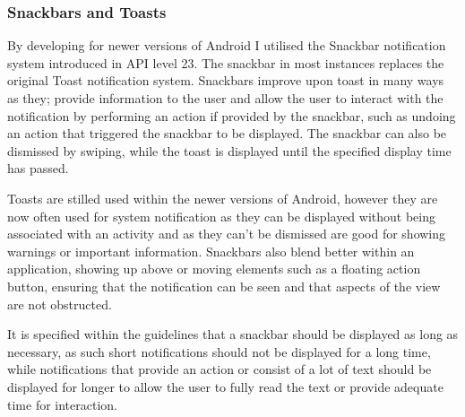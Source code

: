 \subsubsection{Snackbars and Toasts}\label{snackbars-and-toasts}

By developing for newer versions of Android I utilised the Snackbar
notification system introduced in API level 23. The snackbar in most
instances replaces the original Toast notification system. Snackbars
improve upon toast in many ways as they; provide information to the user
and allow the user to interact with the notification by performing an
action if provided by the snackbar, such as undoing an action that
triggered the snackbar to be displayed. The snackbar can also be
dismissed by swiping, while the toast is displayed until the specified
display time has passed.

Toasts are stilled used within the newer versions of Android, however
they are now often used for system notification as they can be displayed
without being associated with an activity and as they can't be dismissed
are good for showing warnings or important information. Snackbars also
blend better within an application, showing up above or moving elements
such as a floating action button, ensuring that the notification can be
seen and that aspects of the view are not obstructed.

It is specified within the guidelines that a snackbar should be
displayed as long as necessary, as such short notifications should not
be displayed for a long time, while notifications that provide an action
or consist of a lot of text should be displayed for longer to allow the
user to fully read the text or provide adequate time for interaction.
